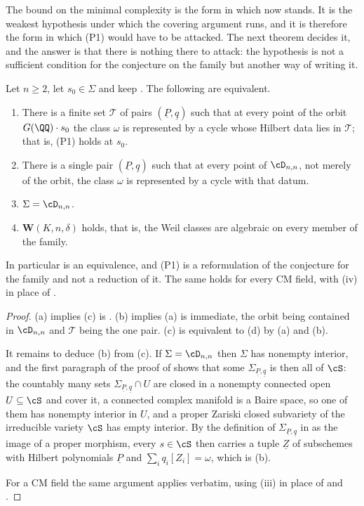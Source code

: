 The bound on the minimal complexity is the form in
which  now stands. It is the weakest hypothesis under
which the covering argument runs, and it is therefore the form in which (P1)
would have to be attacked. The next theorem decides it, and the answer is that
there is nothing there to attack: the hypothesis is not a sufficient condition
for the conjecture on the family but another way of writing it.

\begin{theorem}\label{thm:p1equivalent}
Let $n\ge2$, let $s_{0}\in\Sigma$ and keep . The following
are equivalent.
\begin{enumerate}[label=\textup{(\alph*)},leftmargin=2.6em,itemsep=2pt]
\item There is a finite set $\mathcal{T}$ of pairs
  $(\underline{P},\underline{q})$ such that at every point of the orbit
  $G(\QQ)\cdot s_{0}$ the class $\omega$ is represented by a cycle whose
  Hilbert data lies in $\mathcal{T}$; that is, \textup{(P1)} holds at
  $s_{0}$.
\item There is a single pair $(\underline{P},\underline{q})$ such that at
  every point of $\cD_{n,n}$, not merely of the orbit, the class $\omega$ is
  represented by a cycle with that datum.
\item $\Sigma=\cD_{n,n}$.
\item $\mathbf{W}(K,n,\delta)$ holds, that is, the Weil classes are algebraic
  on every member of the family.
\end{enumerate}
In particular  is an equivalence, and \textup{(P1)} is a
reformulation of the conjecture for the family and not a reduction of it. The
same holds for every CM field, with (iv) in place of
.
\end{theorem}

\begin{proof}
(a) implies (c) is . (b) implies (a) is immediate, the
orbit being contained in $\cD_{n,n}$ and $\mathcal{T}$ being the one pair.
(c) is equivalent to (d) by (a) and (b).

It remains to deduce (b) from (c). If $\Sigma=\cD_{n,n}$ then $\Sigma$ has
nonempty interior, and the first paragraph of the proof of
 shows that some
$\Sigma_{\underline{P},\underline{q}}$ is then all of $\cS$: the countably
many sets $\Sigma_{\underline{P},\underline{q}}\cap U$ are closed in a
nonempty connected open $U\subseteq\cS$ and cover it, a connected complex
manifold is a Baire space, so one of them has nonempty interior in $U$, and a
proper Zariski closed subvariety of the irreducible variety $\cS$ has empty
interior. By the definition of $\Sigma_{\underline{P},\underline{q}}$ in
 as the image of a proper morphism, every $s\in\cS$
then carries a tuple $\underline{Z}$ of subschemes with Hilbert polynomials
$\underline{P}$ and $\sum_{i}q_{i}[Z_{i}]=\omega$, which is (b).

For a CM field the same argument applies verbatim, using
(iii) in place of  and
.
\end{proof}


